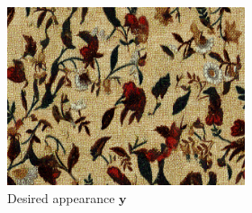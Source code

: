 \begin{figure}[]
    \begin{subfigure}{\textwidth}
        \centering
        \begin{subfigure}{0.2\textwidth}
            \centering
            \includegraphics[width=\textwidth]{images/04-experiment02/photo/flowers2/target.jpg}
            \caption*{Desired appearance \(\bm{y}\)}
        \end{subfigure}
        \hfill
        \begin{subfigure}{0.78\textwidth}
            \centering
            \begin{subfigure}{0.32\textwidth}
                \centering
\end{subfigure}
\end{subfigure}
\end{subfigure}
\end{figure}
